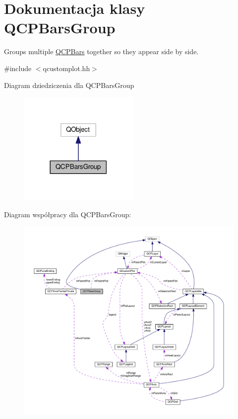 \hypertarget{class_q_c_p_bars_group}{}\section{Dokumentacja klasy Q\+C\+P\+Bars\+Group}
\label{class_q_c_p_bars_group}


Groups multiple \hyperlink{class_q_c_p_bars}{Q\+C\+P\+Bars} together so they appear side by side.  




{\ttfamily \#include $<$qcustomplot.\+hh$>$}



Diagram dziedziczenia dla Q\+C\+P\+Bars\+Group\nopagebreak
\begin{figure}[H]
\begin{center}
\leavevmode
\includegraphics[width=165pt]{class_q_c_p_bars_group__inherit__graph}
\end{center}
\end{figure}


Diagram współpracy dla Q\+C\+P\+Bars\+Group\+:\nopagebreak
\begin{figure}[H]
\begin{center}
\leavevmode
\includegraphics[width=350pt]{class_q_c_p_bars_group__coll__graph}
\end{center}
\end{figure}
